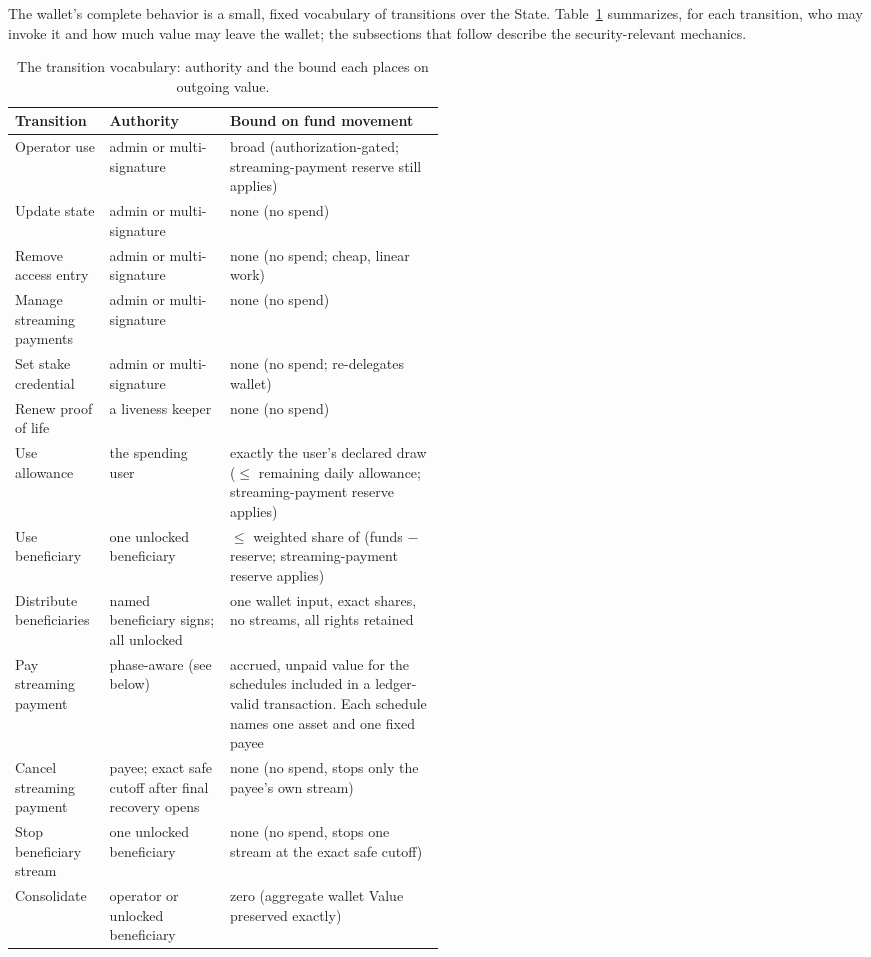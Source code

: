 \documentclass[11pt,DIV=11,parskip=half-]{scrartcl}
\begin{document}
The wallet's complete behavior is a small, fixed vocabulary of transitions over the State. Table~\ref{tab:transitions} summarizes, for each transition, who may invoke it and how much value may leave the wallet; the subsections that follow describe the security-relevant mechanics.

\begin{table}[h]
\centering\small
\renewcommand{\arraystretch}{1.25}
\begin{tabularx}{\linewidth}{@{}p{0.22\linewidth} p{0.28\linewidth} X@{}}
\toprule
\textbf{Transition} & \textbf{Authority} & \textbf{Bound on fund movement} \\
\midrule
Operator use & admin or multi-signature & broad (authorization-gated; streaming-payment reserve still applies) \\
Update state & admin or multi-signature & none (no spend) \\
Remove access entry & admin or multi-signature & none (no spend; cheap, linear work) \\
Manage streaming payments & admin or multi-signature & none (no spend) \\
Set stake credential & admin or multi-signature & none (no spend; re-delegates wallet) \\
Renew proof of life & a liveness keeper & none (no spend) \\
Use allowance & the spending user & exactly the user's declared draw ($\le$ remaining daily allowance; streaming-payment reserve applies) \\
Use beneficiary & one unlocked beneficiary & $\le$ weighted share of (funds $-$ reserve; streaming-payment reserve applies) \\
Distribute beneficiaries & named beneficiary signs; all unlocked & one wallet input, exact shares, no streams, all rights retained \\
Pay streaming payment & phase-aware (see below) & accrued, unpaid value for the schedules included in a ledger-valid transaction. Each schedule names one asset and one fixed payee \\
Cancel streaming payment & payee; exact safe cutoff after final recovery opens & none (no spend, stops only the payee's own stream) \\
Stop beneficiary stream & one unlocked beneficiary & none (no spend, stops one stream at the exact safe cutoff) \\
Consolidate & operator or unlocked beneficiary & zero (aggregate wallet Value preserved exactly) \\
\bottomrule
\end{tabularx}
\caption{The transition vocabulary: authority and the bound each places on outgoing value.}
\label{tab:transitions}
\end{table}
\end{document}
